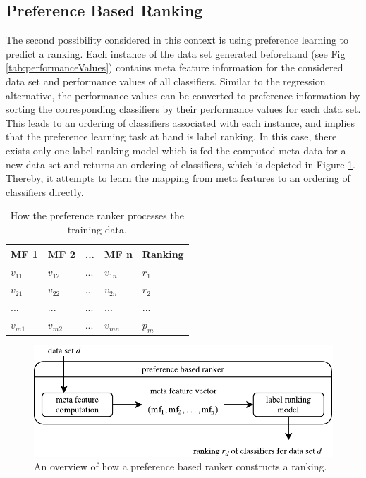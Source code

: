 \subsection{Preference Based Ranking}
The second possibility considered in this context is using preference learning to predict a ranking. Each instance of the data set generated beforehand (see Fig \ref{tab:performanceValues}) contains meta feature information for the considered data set and performance values of all classifiers. Similar to the regression alternative, the performance values can be converted to preference information by sorting the corresponding classifiers by their performance values for each data set. This leads to an ordering of classifiers associated with each instance, and implies that the preference learning task at hand is label ranking. In this case, there exists only one label ranking model which is fed the computed meta data for a new data set and returns an ordering of classifiers, which is depicted in Figure \ref{fig:preference_ranker_model}. Thereby, it attempts to learn the mapping from meta features to an ordering of classifiers directly.

\begin{table}[h]
\centering
	\begin{tabularx}{\textwidth}{X | X | X | X | X}
		MF 1				& MF 2				& ... 	& MF n				& Ranking 	\\ \hline
		$v_{11}$			& $v_{12}$			& ...	& $v_{1n}$			& $r_1$		\\ 
		$v_{21}$			& $v_{22}$			& ...	& $v_{2n}$			& $r_2$		\\
		...				& ...				& ...	& ...				& ...		\\
		$v_{m1}$			& $v_{m2}$			& ... 	& $v_{mn}$			& $p_m$		 
	\end{tabularx}
	\label{tab:preferenceTable}
	\caption{How the preference ranker processes the training data.}
\end{table}

\begin{figure}
\centering
\includegraphics[scale=1]{gfx/label_ranking_model.pdf}
\caption{An overview of how a preference based ranker constructs a ranking.}
\label{fig:preference_ranker_model}
\end{figure}


